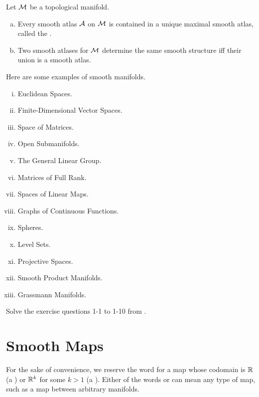\documentclass[11pt,a4paper]{article}
\begin{document}
\begin{theorem}
Let $\mathcal{M}$ be a topological manifold.
\begin{enumerate}[(a)]
    \item Every smooth atlas $\mathcal{A}$ on $\mathcal{M}$ is contained in a unique maximal smooth atlas, called the .
    \item Two smooth atlases for $\mathcal{M}$ determine the same smooth structure iff their union is a smooth atlas.
\end{enumerate}
\end{theorem}

\begin{example}
Here are some examples of smooth manifolds.
\begin{enumerate}[(i)]
    \item Euclidean Spaces.
    \item Finite-Dimensional Vector Spaces.
    \item Space of Matrices.
    \item Open Submanifolds.
    \item The General Linear Group.
    \item Matrices of Full Rank.
    \item Spaces of Linear Maps.
    \item Graphs of Continuous Functions.
    \item Spheres.
    \item Level Sets.
    \item Projective Spaces.
    \item Smooth Product Manifolds.
    \item Grassmann Manifolds.
\end{enumerate}
\end{example}

Solve the exercise questions 1-1 to 1-10 from \cite[Ch 1]{JohnLee}.

\section{Smooth Maps}

\begin{note}
For the sake of convenience, we reserve the word  for a map whose codomain is $\mathbb{R}$ (a ) or $\mathbb{R}^k$ for some $k>1$ (a ). Either of the words  or  can mean any type of map, such as a map between arbitrary manifolds.
\end{note}
\end{document}
